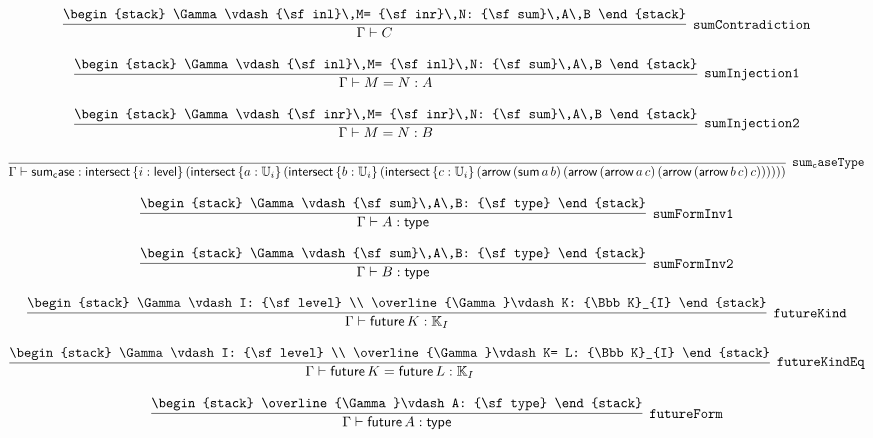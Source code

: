 \[
\infer[{\tt sumContradiction}]{\Gamma \vdash C}{
\begin{stack}
\Gamma \vdash {\sf inl}\,M= {\sf inr}\,N: {\sf sum}\,A\,B
\end{stack}}
\]

\[
\infer[{\tt sumInjection1}]{\Gamma \vdash M= N: A}{
\begin{stack}
\Gamma \vdash {\sf inl}\,M= {\sf inl}\,N: {\sf sum}\,A\,B
\end{stack}}
\]

\[
\infer[{\tt sumInjection2}]{\Gamma \vdash M= N: B}{
\begin{stack}
\Gamma \vdash {\sf inr}\,M= {\sf inr}\,N: {\sf sum}\,A\,B
\end{stack}}
\]

\[
\infer[{\tt sum_caseType}]{\Gamma \vdash {\sf sum_case}: {\sf intersect}\,\{i : {\sf level}\}\,({\sf intersect}\,\{a : {\Bbb U}_{i}\}\,({\sf intersect}\,\{b : {\Bbb U}_{i}\}\,({\sf intersect}\,\{c : {\Bbb U}_{i}\}\,({\sf arrow}\,({\sf sum}\,a\,b)\,({\sf arrow}\,({\sf arrow}\,a\,c)\,({\sf arrow}\,({\sf arrow}\,b\,c)\,c))))))}{}
\]

\[
\infer[{\tt sumFormInv1}]{\Gamma \vdash A: {\sf type}}{
\begin{stack}
\Gamma \vdash {\sf sum}\,A\,B: {\sf type}
\end{stack}}
\]

\[
\infer[{\tt sumFormInv2}]{\Gamma \vdash B: {\sf type}}{
\begin{stack}
\Gamma \vdash {\sf sum}\,A\,B: {\sf type}
\end{stack}}
\]

\[
\infer[{\tt futureKind}]{\Gamma \vdash {\sf future}\,K: {\Bbb K}_{I}}{
\begin{stack}
\Gamma \vdash I: {\sf level}
\\
\overline{\Gamma}\vdash K: {\Bbb K}_{I}
\end{stack}}
\]

\[
\infer[{\tt futureKindEq}]{\Gamma \vdash {\sf future}\,K= {\sf future}\,L: {\Bbb K}_{I}}{
\begin{stack}
\Gamma \vdash I: {\sf level}
\\
\overline{\Gamma}\vdash K= L: {\Bbb K}_{I}
\end{stack}}
\]

\[
\infer[{\tt futureForm}]{\Gamma \vdash {\sf future}\,A: {\sf type}}{
\begin{stack}
\overline{\Gamma}\vdash A: {\sf type}
\end{stack}}
\]

